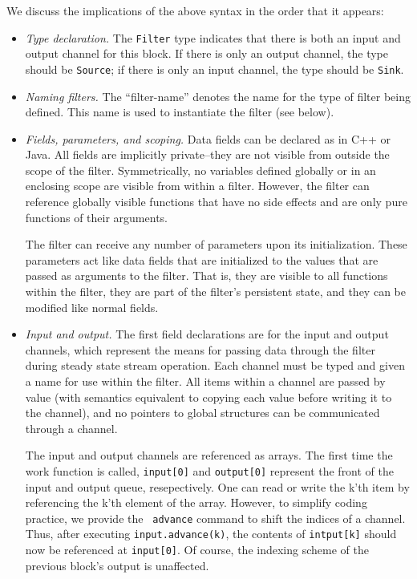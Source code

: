 \documentclass[draft]{article}
\begin{document}
We discuss the implications of the above syntax in the order that it
appears:

\begin{itemize}

\item {\it Type declaration.}  The {\tt Filter} type indicates that
there is both an input and output channel for this block.  If there is
only an output channel, the type should be {\tt Source}; if there is
only an input channel, the type should be {\tt Sink}.

\item {\it Naming filters.}  The ``filter-name'' denotes the name for
the type of filter being defined.  This name is used to instantiate
the filter (see below).

\item {\it Fields, parameters, and scoping.}  Data fields can be
declared as in C++ or Java.  All fields are implicitly private--they
are not visible from outside the scope of the filter.  Symmetrically,
no variables defined globally or in an enclosing scope are visible
from within a filter.  However, the filter can reference globally
visible functions that have no side effects and are only pure
functions of their arguments.

The filter can receive any number of parameters upon its
initialization.  These parameters act like data fields that are
initialized to the values that are passed as arguments to the filter.
That is, they are visible to all functions within the filter, they are
part of the filter's persistent state, and they can be modified like
normal fields.

\item {\it Input and output.}  The first field declarations are for
the input and output channels, which represent the means for passing
data through the filter during steady state stream operation.  Each
channel must be typed and given a name for use within the filter.  All
items within a channel are passed by value (with semantics equivalent
to copying each value before writing it to the channel), and no
pointers to global structures can be communicated through a channel.

The input and output channels are referenced as arrays.  The first
time the work function is called, {\tt input[0]} and {\tt output[0]}
represent the front of the input and output queue, resepectively.  One
can read or write the k'th item by referencing the k'th element of the
array.  However, to simplify coding practice, we provide the {\tt
advance} command to shift the indices of a channel.  Thus, after
executing {\tt input.advance(k)}, the contents of {\tt intput[k]}
should now be referenced at {\tt input[0]}.  Of course, the indexing
scheme of the previous block's output is unaffected.


\end{itemize}
\end{document}
